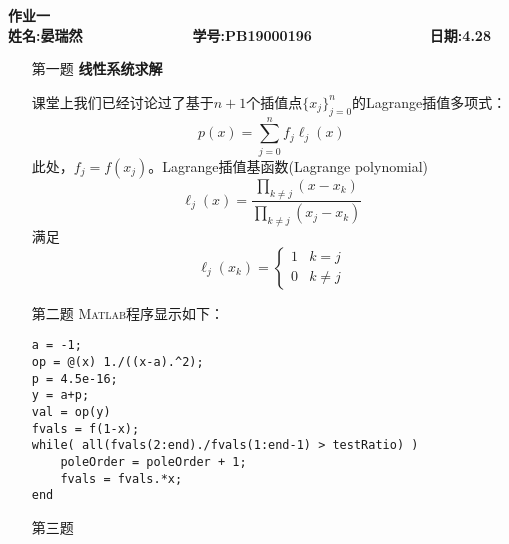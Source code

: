 \documentclass[12pt,a4paper,utf8]{ctexart}
\begin{document}


\begin{center}
\textbf{作业一}\\
\textbf{姓名:晏瑞然~~~~~~~~~~~~~ 学号:PB19000196~~~~~~~~~~~~~~ 日期:4.28}\\
\end{center}

\begin{center}
\fbox{
\begin{minipage}{40em}
\vspace{5cm}
\hspace{20cm}
\end{minipage}}
\end{center}
\vspace{1cm}

\begin{enumerate}
\item[第一题] \textbf{线性系统求解}  

课堂上我们已经讨论过了基于$n+1$个插值点$\{x_j\}_{j=0}^n$的Lagrange插值多项式：
\begin{equation}
p(x) = \sum_{j=0}^{n} f_j \ell_j(x) \label{lagrange}
\end{equation}
此处，$f_j = f(x_j)$。Lagrange插值基函数(Lagrange polynomial)
\begin{equation}
\ell_{j}(x)=\frac{\prod_{k \neq j}\left(x-x_{k}\right)}{\prod_{k \neq j}\left(x_{j}-x_{k}\right)} \label{cardinal}
\end{equation}
满足
\begin{equation}
\ell_{j}\left(x_{k}\right)=\left\{\begin{array}{ll}
1 & k=j \\
0 & k \neq j
\end{array}\right. \nonumber
\end{equation}


\item[第二题]
\textsc{Matlab}程序显示如下：
\begin{lstlisting}[frame=single]
a = -1;
op = @(x) 1./((x-a).^2);
p = 4.5e-16;
y = a+p;
val = op(y)
fvals = f(1-x);
while( all(fvals(2:end)./fvals(1:end-1) > testRatio) )
    poleOrder = poleOrder + 1;
    fvals = fvals.*x;
end
\end{lstlisting}

\item[第三题]



\end{enumerate}
\end{document}
